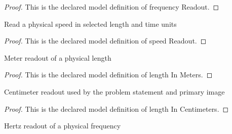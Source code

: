 \begin{proof}
  This is the declared model definition of frequency Readout.
\end{proof}
\begin{definition}
  \label{def:physics:phyx-mini-0184:phyxminiproblems-problemphyxmini0184-speedreadout}
  Read a physical speed in selected length and time units
\end{definition}
\begin{proof}
  This is the declared model definition of speed Readout.
\end{proof}
\begin{definition}
  \label{def:physics:phyx-mini-0184:phyxminiproblems-problemphyxmini0184-lengthinmeters}
  Meter readout of a physical length
\end{definition}
\begin{proof}
  This is the declared model definition of length In Meters.
\end{proof}
\begin{definition}
  \label{def:physics:phyx-mini-0184:phyxminiproblems-problemphyxmini0184-lengthincentimeters}
  Centimeter readout used by the problem statement and primary image
\end{definition}
\begin{proof}
  This is the declared model definition of length In Centimeters.
\end{proof}
\begin{definition}
  \label{def:physics:phyx-mini-0184:phyxminiproblems-problemphyxmini0184-frequencyinhertz}
  Hertz readout of a physical frequency
\end{definition}
